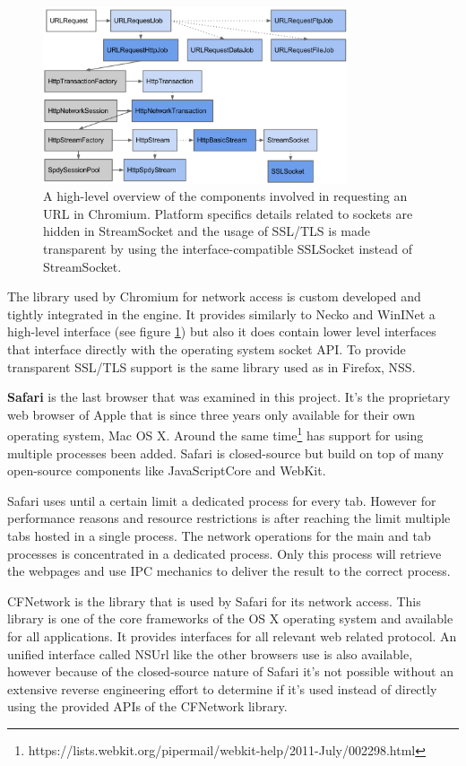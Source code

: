 \begin{figure}[h]
    \centering
    \includegraphics[width=9cm]{Images/Chrome_network.png}
    \caption{A high-level overview of the components involved in requesting an URL in Chromium. Platform specifics details related to sockets are hidden in StreamSocket and the usage of SSL/TLS is made transparent by using the interface-compatible SSLSocket instead of StreamSocket. \cite{http://www.chromium.org/developers/design-documents/network-stack, modified}}
    \label{fig:chrome_network}
\end{figure}

The library used by Chromium for network access is custom developed and tightly integrated in the engine. It provides similarly to Necko and WinINet a high-level interface (see figure \ref{fig:chrome_network}) but also it does contain lower level interfaces that interface directly with the operating system socket API. To provide transparent SSL/TLS support is the same library used as in Firefox, NSS.

\textbf{Safari} is the last browser that was examined in this project. It's the proprietary web browser of Apple that is since three years only available for their own operating system, Mac OS X. Around the same time\footnote{https://lists.webkit.org/pipermail/webkit-help/2011-July/002298.html} has support for using multiple processes been added. Safari is closed-source but build on top of many open-source components like JavaScriptCore and WebKit.

Safari uses until a certain limit a dedicated process for every tab. However for performance reasons and resource restrictions is after reaching the limit multiple tabs hosted in a single process. The network operations for the main and tab processes is concentrated in a dedicated process. Only this process will retrieve the webpages and use IPC mechanics to deliver the result to the correct process. 

CFNetwork is the library that is used by Safari for its network access. This library is one of the core frameworks of the OS X operating system and available for all applications. It provides interfaces for all relevant web related protocol. An unified interface called NSUrl like the other browsers use is also available, however because of the closed-source nature of Safari it's not possible without an extensive reverse engineering effort to determine if it's used instead of directly using the provided APIs of the CFNetwork library.

